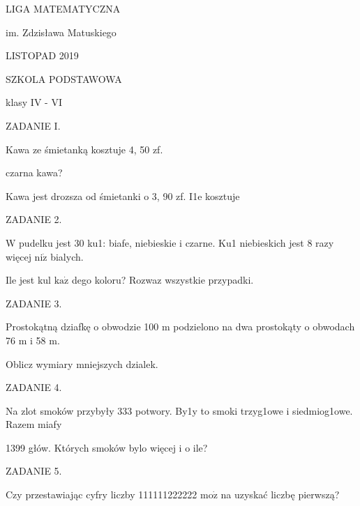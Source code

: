 \documentclass[a4paper,12pt]{article}
\begin{document}
LIGA MATEMATYCZNA

im. Zdzisława Matuskiego

LISTOPAD 2019

SZKOLA PODSTAWOWA

klasy IV - VI

ZADANIE I.

Kawa ze śmietanką kosztuje 4, 50 zf.

czarna kawa?

Kawa jest drozsza od śmietanki o 3, 90 zf. I1e kosztuje

ZADANIE 2.

$\mathrm{W}$ pudelku jest 30 ku1: biafe, niebieskie i czarne. Ku1 niebieskich jest 8 razy więcej $\mathrm{n}\mathrm{i}\dot{\mathrm{z}}$ bialych.

Ile jest kul $\mathrm{k}\mathrm{a}\dot{\mathrm{z}}$ dego koloru? Rozwaz wszystkie przypadki.

ZADANIE 3.

Prostokątną dziafkę o obwodzie 100 $\mathrm{m}$ podzielono na dwa prostokąty o obwodach 76 $\mathrm{m}$ i 58 $\mathrm{m}.$

Oblicz wymiary mniejszych dzialek.

ZADANIE 4.

Na zlot smoków przybyły 333 potwory. By1y to smoki trzyg1owe i siedmiog1owe. Razem miafy

1399 głów. Których smoków bylo więcej i o ile?

ZADANIE 5.

Czy przestawiając cyfry liczby 111111222222 $\mathrm{m}\mathrm{o}\dot{\mathrm{z}}$ na uzyskać liczbę pierwszą?
\end{document}
